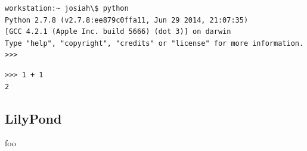 \begin{singlespacing}
\vspace{-0.5\baselineskip}
\begin{lstlisting}
workstation:~ josiah\$ python
Python 2.7.8 (v2.7.8:ee879c0ffa11, Jun 29 2014, 21:07:35)
[GCC 4.2.1 (Apple Inc. build 5666) (dot 3)] on darwin
Type "help", "copyright", "credits" or "license" for more information.
>>>
\end{lstlisting}
\end{singlespacing}

\begin{singlespacing}
\vspace{-0.5\baselineskip}
\begin{lstlisting}
>>> 1 + 1
2
\end{lstlisting}
\end{singlespacing}

\subsection{LilyPond}

foo

